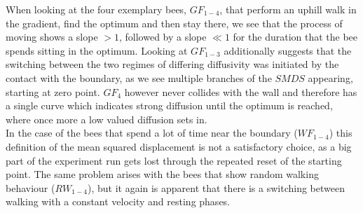 When looking at the four exemplary bees, $GF_{1-4}$, that perform an uphill walk in the gradient, find the optimum and then stay there, we see that the process of moving shows a slope $>1$, followed by a slope $\ll 1$ for the duration that the bee spends sitting in the optimum. Looking at $GF_{1-3}$ additionally suggests that the switching between the two regimes of differing diffusivity was initiated by the contact with the boundary, as we see multiple branches of the $SMDS$ appearing, starting at zero point. $GF_4$ however never collides with the wall and therefore has a single curve which indicates strong diffusion until the optimum is reached, where once more a low valued diffusion sets in. 
\\
In the case of the bees that spend a lot of time near the boundary ($WF_{1-4}$) this definition of the mean squared displacement is not a satisfactory choice, as a big part of the experiment run gets lost through the repeated reset of the starting point. The same problem arises with the bees that show random walking behaviour ($RW_{1-4}$), but it again is apparent that there is a switching between walking with a constant velocity and resting phases.
\\


